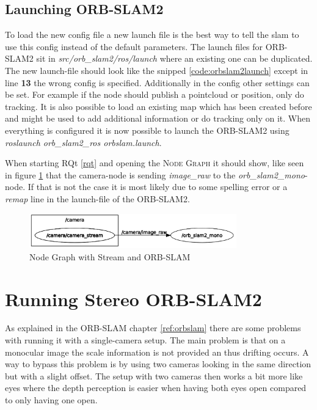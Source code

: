 \subsection{Launching ORB-SLAM2}
To load the new config file a new launch file is the best way to tell the \gls{slam} to use this config instead of the default parameters. The launch files for ORB-SLAM2 sit in \textit{src/orb\_slam2/ros/launch} where an existing one can be duplicated. The new launch-file should look like the snipped \ref{code:orbslam2launch} except in line \textbf{13} the wrong config is specified. Additionally in the config other settings can be set. For example if the node should publish a pointcloud or position, only do tracking. It is also possible to load an existing map which has been created before and might be used to add additional information or do tracking only on it. When everything is configured it is now possible to launch the ORB-SLAM2 using \textit{roslaunch orb\_slam2\_ros orbslam.launch}. \newline


When starting RQt \ref{rqt} and opening the \textsc{Node Graph} it should show, like seen in figure \ref{img:nodegraphstreamorbslam} that the camera-node is sending \textit{image\_raw} to the \textit{orb\_slam2\_mono}-node. If that is not the case it is most likely due to some spelling error or a \textit{remap} line in the launch-file of the ORB-SLAM2.\newline
\begin{figure}[h]
	\centering
	\includegraphics[width=0.8\textwidth]{./media/images/nodegraphstreamorbslam.png}
  	\caption{Node Graph with Stream and ORB-SLAM}
  	\label{img:nodegraphstreamorbslam}
\end{figure}


\section{Running Stereo ORB-SLAM2\authorA}
As explained in the ORB-SLAM chapter \ref{ref:orbslam} there are some problems with running it with a single-camera setup. The main problem is that on a monocular image the scale information is not provided an thus drifting occurs. A way to bypass this problem is by using two cameras looking in the same direction but with a slight offset. The setup with two cameras then works a bit more like eyes where the depth perception is easier when having both eyes open compared to only having one open.

